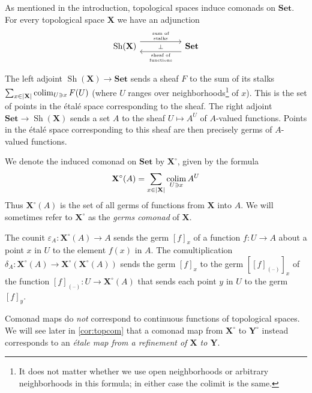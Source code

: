 \documentclass[11pt, oneside, article]{memoir}
\theoremstyle{plain}
\theoremstyle{definition}
\theoremstyle{remark}
\newenvironment{example}
{\renewcommand\qedsymbol{$\lrcorner$}%
  \pushQED{\qed}\myexample}
{\popQED\endmyexample}
\DeclareMathOperator{\Sh}{Sh}
\DeclareMathOperator*{\colim}{colim}
\DeclarePairedDelimiter{\abs}{\lvert}{\rvert}
\newcommand{\dash}{{\mathord{\text{--}}}}
\newcommand{\namedcat}[1]{\mathbf{#1}}
\newcommand{\spa}[1]{\mathbf{#1}}
\newcommand{\Set}{\namedcat{Set}}
\newcommand{\pts}[1]{{\abs{#1}}}
\newcommand{\xA}{A}
\newcommand{\tX}{\spa{X}}
\newcommand{\tY}{\spa{Y}}
\newcommand{\cX}{\toptocmd{\tX}}
\newcommand{\cY}{\toptocmd{\tY}}
\newcommand{\toptocmd}[1]{{{#1}^\circ}}
\begin{document}
\begin{example}[Topological spaces]\label{ex:top}
  As mentioned in the introduction, topological spaces induce comonads
  on $\Set$. For every topological space $\tX$ we have an adjunction
  \[
    \begin{tikzcd}[column sep=50pt]
      \Sh(\tX)\ar[r, shift left=6pt,
      "\parbox{50pt}{\centering\tiny sum of\\ stalks}"]\ar["\bot"{anchor=center},r, draw=none]&
      \Set\ar[l, shift left=6pt, "\parbox{50pt}{\centering\tiny sheaf of\\ functions}"]
    \end{tikzcd}
  \]
  
  The left adjoint $\Sh(\tX) \to \Set$ sends a sheaf $F$ to the sum of
  its stalks $\sum_{x\in \pts{\tX}} \colim_{U \ni x} F(U)$ (where $U$
  ranges over neighborhoods\footnote{It does not matter whether we use
    open neighborhoods or arbitrary neighborhoods in this formula; in
    either case the colimit is the same.} of $x$). This is the set of
  points in the \'etal\'e space corresponding to the sheaf. The right
  adjoint $\Set \to \Sh(\tX)$ sends a set $\xA$ to the sheaf
  $U \mapsto \xA^U$ of $\xA$-valued functions. Points in the \'etal\'e
  space corresponding to this sheaf are then precisely germs of
  $\xA$-valued functions.

  We denote the induced comonad on $\Set$ by $\cX$, given
  by the formula
  \[\cX(\xA) = \sum_{x\in \pts{\tX}} \colim_{U \ni x} \xA^U\]
  Thus $\cX(\xA)$ is the set of all germs of functions from
  $\tX$ into $\xA$. We will sometimes refer to $\cX$ as the
  \emph{germs comonad} of $\tX$.

  The counit $\varepsilon_\xA \colon \cX(\xA) \to \xA$ sends
  the germ $[f]_x$ of a function $f \colon U \to \xA$ about a point
  $x$ in $U$ to the element $f(x)$ in $\xA$. The comultiplication
  $\delta_\xA \colon \cX(\xA) \to
  \cX(\cX(\xA))$ sends the germ $[f]_x$ to the
  germ $[[f]_{(\dash)}]_x$ of the function
  $[f]_{(\dash)} \colon U \to \cX(A)$ that sends each point
  $y$ in $U$ to the germ $[f]_y$.

  Comonad maps do \emph{not} correspond to continuous functions of
  topological spaces. We will see later in \cref{cor:topcom} that a
  comonad map from $\cX$ to $\cY$ instead
  corresponds to an \emph{\'etale map from a refinement of $\tX$ to
    $\tY$}.
\end{example}
\end{document}

